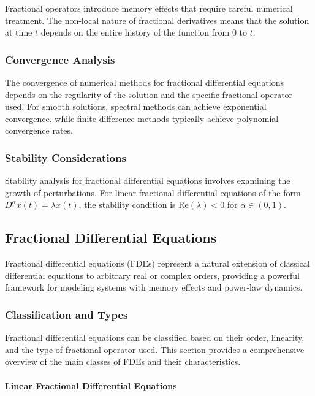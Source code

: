 Fractional operators introduce memory effects that require careful numerical treatment. The non-local nature of fractional derivatives means that the solution at time $t$ depends on the entire history of the function from $0$ to $t$.

\subsubsection{Convergence Analysis}

The convergence of numerical methods for fractional differential equations depends on the regularity of the solution and the specific fractional operator used. For smooth solutions, spectral methods can achieve exponential convergence, while finite difference methods typically achieve polynomial convergence rates.

\subsubsection{Stability Considerations}

Stability analysis for fractional differential equations involves examining the growth of perturbations. For linear fractional differential equations of the form $D^{\alpha} x(t) = \lambda x(t)$, the stability condition is $\text{Re}(\lambda) < 0$ for $\alpha \in (0,1)$.

\subsection{Fractional Differential Equations}

Fractional differential equations (FDEs) represent a natural extension of classical differential equations to arbitrary real or complex orders, providing a powerful framework for modeling systems with memory effects and power-law dynamics.

\subsubsection{Classification and Types}

Fractional differential equations can be classified based on their order, linearity, and the type of fractional operator used. This section provides a comprehensive overview of the main classes of FDEs and their characteristics.

\paragraph{Linear Fractional Differential Equations}

